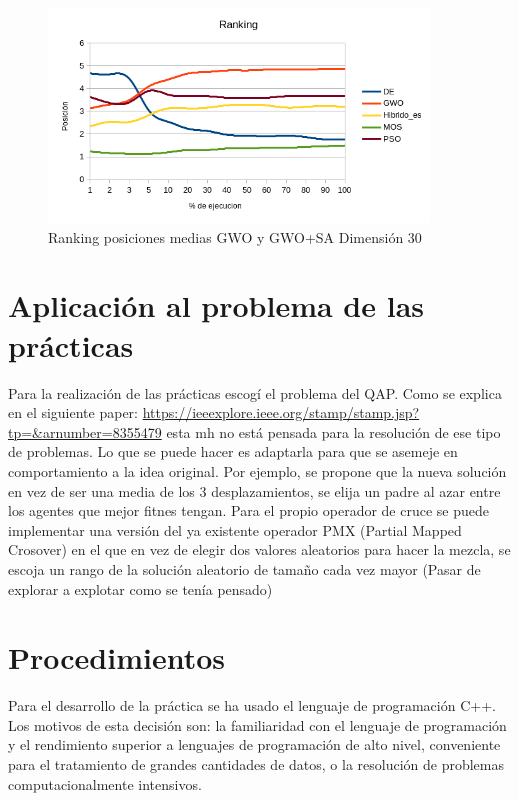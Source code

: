 \documentclass[a4paper, 12.5pt]{report}
\begin{document}
\begin{figure}[H]
    \centering
    \caption{Ranking posiciones medias GWO y GWO+SA Dimensión 30}
    \includegraphics[width=0.9\textwidth]{Resultados/hibrido/Externo/D30/media_posicion.png}


\end{figure}






\section{Aplicación al problema de las prácticas}

Para la realización de las prácticas escogí el problema del QAP. Como se explica en el siguiente paper: \url{https://ieeexplore.ieee.org/stamp/stamp.jsp?tp=&arnumber=8355479} esta mh no está pensada para la resolución de ese tipo de problemas. Lo que se puede hacer es adaptarla para que se asemeje en comportamiento a la idea original. Por ejemplo, se propone que la nueva solución en vez de ser una media de los 3 desplazamientos, se elija un padre al azar entre los agentes que mejor fitnes tengan. Para el propio operador de cruce se puede implementar una versión del ya existente operador PMX (Partial Mapped Crosover) en el que en vez de elegir dos valores aleatorios para hacer la mezcla, se escoja un rango de la solución aleatorio de tamaño cada vez mayor (Pasar de explorar a explotar como se tenía pensado)


\section{Procedimientos}

Para el desarrollo de la práctica se ha usado el lenguaje de programación C++. Los motivos de esta decisión son: la familiaridad con el lenguaje de programación y el rendimiento superior a lenguajes de programación de alto nivel, conveniente para el tratamiento de grandes cantidades de datos, o la resolución de problemas computacionalmente intensivos.
\end{document}

